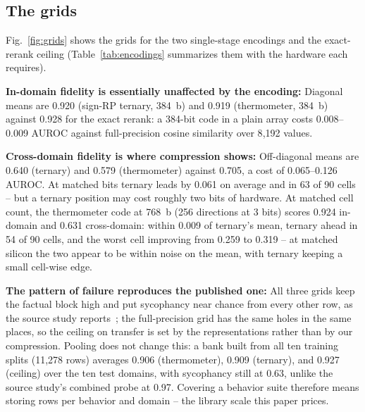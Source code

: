 \documentclass[conference]{IEEEtran}
\newcommand{\auroc}{{AUROC}\xspace}
\newcommand{\signrp}{{sign-RP}\xspace}
\begin{document}
\subsection{The grids}
\label{subsec:Grids}
Fig.~\ref{fig:grids} shows the grids for the two single-stage
encodings and the exact-rerank ceiling (Table~\ref{tab:encodings}
summarizes them with the hardware each requires).

\textbf{In-domain fidelity is essentially unaffected by the
encoding:} Diagonal means are 0.920 (\signrp ternary, 384~b) and
0.919 (thermometer, 384~b) against 0.928 for the exact rerank: a
384-bit code in a plain array costs 0.008--0.009 \auroc against
full-precision cosine similarity over 8{,}192 values.

\textbf{Cross-domain fidelity is where compression shows:}
Off-diagonal means are 0.640 (ternary) and 0.579 (thermometer)
against 0.705, a cost of 0.065--0.126 \auroc. At matched bits ternary
leads by 0.061 on average and in 63 of 90 cells -- but a ternary
position may cost roughly two bits of hardware. At matched cell
count, the thermometer code at 768~b (256 directions at 3 bits)
scores 0.924 in-domain and 0.631 cross-domain: within 0.009 of
ternary's mean, ternary ahead in 54 of 90 cells, and the worst cell
improving from 0.259 to 0.319 -- at matched silicon the two appear
to be within noise on the mean, with ternary keeping a small
cell-wise edge.

\textbf{The pattern of failure reproduces the published one:} All
three grids keep the factual block high and put sycophancy near
chance from every other row, as the source study
reports~\cite{ying2026spectrum}; the full-precision grid has the
same holes in the same places, so the ceiling on transfer is set by
the representations rather than by our compression. Pooling does not
change this: a bank built from all ten
training splits (11{,}278 rows) averages 0.906 (thermometer), 0.909
(ternary), and 0.927 (ceiling) over the ten test domains, with
sycophancy still at 0.63, unlike the source study's combined probe at
0.97. Covering a behavior suite therefore means storing rows per
behavior and domain -- the library scale this paper prices.
\end{document}
